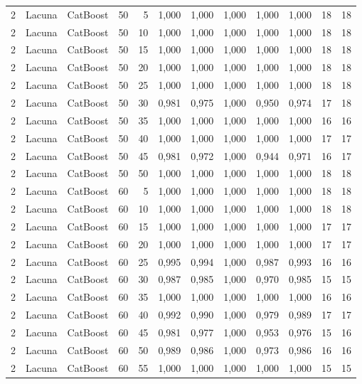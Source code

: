\begin{longtable}{@{}rllrrrrrrrrr@{}}
2 & Lacuna & CatBoost & 50 & 5 & 1,000 & 1,000 & 1,000 & 1,000 & 1,000 & 18 & 18 \\
2 & Lacuna & CatBoost & 50 & 10 & 1,000 & 1,000 & 1,000 & 1,000 & 1,000 & 18 & 18 \\
2 & Lacuna & CatBoost & 50 & 15 & 1,000 & 1,000 & 1,000 & 1,000 & 1,000 & 18 & 18 \\
2 & Lacuna & CatBoost & 50 & 20 & 1,000 & 1,000 & 1,000 & 1,000 & 1,000 & 18 & 18 \\
2 & Lacuna & CatBoost & 50 & 25 & 1,000 & 1,000 & 1,000 & 1,000 & 1,000 & 18 & 18 \\
2 & Lacuna & CatBoost & 50 & 30 & 0,981 & 0,975 & 1,000 & 0,950 & 0,974 & 17 & 18 \\
2 & Lacuna & CatBoost & 50 & 35 & 1,000 & 1,000 & 1,000 & 1,000 & 1,000 & 16 & 16 \\
2 & Lacuna & CatBoost & 50 & 40 & 1,000 & 1,000 & 1,000 & 1,000 & 1,000 & 17 & 17 \\
2 & Lacuna & CatBoost & 50 & 45 & 0,981 & 0,972 & 1,000 & 0,944 & 0,971 & 16 & 17 \\
2 & Lacuna & CatBoost & 50 & 50 & 1,000 & 1,000 & 1,000 & 1,000 & 1,000 & 18 & 18 \\
2 & Lacuna & CatBoost & 60 & 5 & 1,000 & 1,000 & 1,000 & 1,000 & 1,000 & 18 & 18 \\
2 & Lacuna & CatBoost & 60 & 10 & 1,000 & 1,000 & 1,000 & 1,000 & 1,000 & 18 & 18 \\
2 & Lacuna & CatBoost & 60 & 15 & 1,000 & 1,000 & 1,000 & 1,000 & 1,000 & 17 & 17 \\
2 & Lacuna & CatBoost & 60 & 20 & 1,000 & 1,000 & 1,000 & 1,000 & 1,000 & 17 & 17 \\
2 & Lacuna & CatBoost & 60 & 25 & 0,995 & 0,994 & 1,000 & 0,987 & 0,993 & 16 & 16 \\
2 & Lacuna & CatBoost & 60 & 30 & 0,987 & 0,985 & 1,000 & 0,970 & 0,985 & 15 & 15 \\
2 & Lacuna & CatBoost & 60 & 35 & 1,000 & 1,000 & 1,000 & 1,000 & 1,000 & 16 & 16 \\
2 & Lacuna & CatBoost & 60 & 40 & 0,992 & 0,990 & 1,000 & 0,979 & 0,989 & 17 & 17 \\
2 & Lacuna & CatBoost & 60 & 45 & 0,981 & 0,977 & 1,000 & 0,953 & 0,976 & 15 & 16 \\
2 & Lacuna & CatBoost & 60 & 50 & 0,989 & 0,986 & 1,000 & 0,973 & 0,986 & 16 & 16 \\
2 & Lacuna & CatBoost & 60 & 55 & 1,000 & 1,000 & 1,000 & 1,000 & 1,000 & 15 & 15 \\

\end{longtable}
